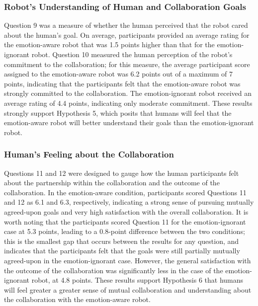 \documentclass[12pt]{report}
\begin{document}
\subsubsection{Robot's Understanding of Human and Collaboration Goals}
\label{sec:Goals}
Question 9 was a measure of whether the human perceived that the robot cared
about the human's goal. On average, participants provided an average rating for
the emotion-aware robot that was 1.5 points higher than that for the
emotion-ignorant robot. Question 10 measured the human perception of the
robot's commitment to the collaboration; for this measure, the average
participant score assigned to the emotion-aware robot was 6.2 points out of a
maximum of 7 points, indicating that the participants felt that the
emotion-aware robot was strongly committed to the collaboration. The
emotion-ignorant robot received an average rating of 4.4 points, indicating
only moderate commitment. These results strongly support Hypothesis 5, which
posits that humans will feel that the emotion-aware robot will better understand
their goals than the emotion-ignorant robot.

\subsubsection{Human's Feeling about the Collaboration}
\label{sec:Collaboration}
Questions 11 and 12 were designed to gauge how the human participants felt
about the partnership within the collaboration and the outcome of the
collaboration. In the emotion-aware condition, participants scored Questions 11
and 12 as 6.1 and 6.3, respectively, indicating a strong sense of pursuing
mutually agreed-upon goals and very high satisfaction with the overall
collaboration. It is worth noting that the participants scored Question 11 for
the emotion-ignorant case at 5.3 points, leading to a 0.8-point difference
between the two conditions; this is the smallest gap that occurs between the
results for any question, and indicates that the participants felt that the
goals were still partially mutually agreed-upon in the emotion-ignorant case.
However, the general satisfaction with the outcome of the collaboration was
significantly less in the case of the emotion-ignorant robot, at 4.8 points.
These results support Hypothesis 6 that humans will feel greater a greater sense
of mutual collaboration and understanding about the collaboration with the
emotion-aware robot.
\end{document}

